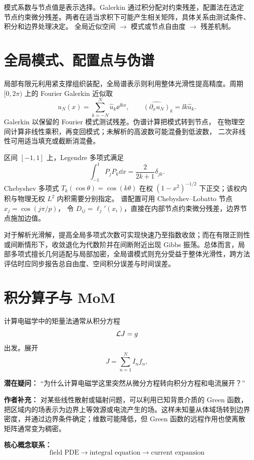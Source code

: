 {模式系数与节点值是表示选择。Galerkin 通过积分配对约束残差，配置法在选定节点约束微分残差。两者在适当求积下可能产生相关矩阵，具体关系由测试条件、积分和边界处理决定。}
{全局近似空间 $\longrightarrow$ 模式或节点自由度 $\longrightarrow$ 残差机制。}

\section{全局模式、配置点与伪谱}
局部有限元利用紧支撑组织装配，全局谱表示则利用整体光滑性提高精度。周期 $[0,2\pi)$ 上的 Fourier Galerkin 近似取
\[
u_N(x)=\sum_{k=-N}^{N}\widehat u_k\ee^{\ii kx},\qquad
\widehat{(\partial_xu_N)}_k=\ii k\widehat u_k.
\]
Galerkin 以保留的 Fourier 模式测试残差。伪谱计算把模式转到节点，
在物理空间计算非线性乘积，再变回模式；未解析的高波数可能混叠到低波数，
二次非线性可用适当填充或截断消混叠。

区间 $[-1,1]$ 上，Legendre 多项式满足
\[
\int_{-1}^1P_jP_k\dd x=\frac{2}{2k+1}\delta_{jk}.
\]
Chebyshev 多项式 $T_k(\cos\theta)=\cos(k\theta)$
在权 $(1-x^2)^{-1/2}$ 下正交；该权内积与物理无权 $L^2$ 内积需要分别指定。
谱配置可用 Chebyshev--Lobatto 节点 $x_j=\cos(j\pi/p)$，
令 $D_{ij}=\ell_j'(x_i)$，直接在内部节点约束微分残差，边界节点施加边值。

对于解析光滑解，提高全局多项式次数可实现快速乃至指数收敛；而在有限正则性或间断情形下，收敛退化为代数阶并在间断附近出现 Gibbs 振荡。总体而言，局部多项式擅长几何适配与局部加密，全局谱模式则充分受益于整体光滑性，跨方法评估时应同步报告总自由度、空间积分误差与时间误差。

\section{积分算子与 MoM}
计算电磁学中的矩量法通常从积分方程
\[
\mathcal L J=g
\]
出发。展开
\[
J=\sum_{n=1}^N I_nf_n,
\]

\begin{authornote}
\textbf{潜在疑问：}
“为什么计算电磁学这里突然从微分方程转向积分方程和电流展开？”

\textbf{作者补充：}
对某些线性散射或辐射问题，可以利用已知背景介质的 Green 函数，把区域内的场表示为边界上等效源或电流产生的场。这样未知量从体域场转到边界密度，并通过边界条件确定；维数可能降低，但 Green 函数的远程作用也使离散矩阵通常变为稠密。

\textbf{核心概念联系：}
\[
\text{field PDE}
\longrightarrow
\text{integral equation}
\longrightarrow
\text{current expansion}
\]
\end{authornote}

